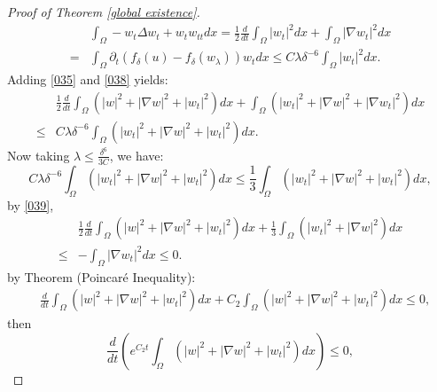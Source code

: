 \documentclass{article}
\numberwithin{equation}{section}
\begin{document}
\begin{proof}[Proof of Theorem \ref{global existence}]
\begin{equation}
\begin{aligned}
&\int_{\Omega}-w_{t}\Delta w_{t}+w_{t}w_{tt} d x
=\frac{1}{2}\frac{d}{d t} \int_{\Omega}|w_{t}|^{2} d x+\int_{\Omega}|\nabla w_{t}|^{2} d x \\=&  \int_{\Omega}\partial_{t}\left(f_{\delta}(u)-f_{\delta}\left(w_{\lambda} \right)\right) w_{t} d x  \le  C \lambda \delta^{-6} \int_{\Omega}\left|w_{t}\right|^{2} d x.
\end{aligned}\label{038}
\end{equation}
Adding \eqref{035} and \eqref{038} yields:
\begin{equation}
\begin{aligned}
&\frac{1}{2}\frac{d}{d t} \int_{\Omega}\left(\left|w\right|^{2}+|\nabla w|^{2}+| w_t|^{2}\right) d x+\int_{\Omega}\left(\left|w_{t}\right|^{2}+|\nabla w|^{2}+|\nabla w_t|^{2}\right) d x
\\ \le &C \lambda \delta^{-6} \int_{\Omega}\left(\left|w_{t}\right|^{2}+|\nabla w|^{2}+| w_t|^{2}\right) d x.
\end{aligned} \label{039}
\end{equation}
Now taking $\lambda \le \frac{\delta^{6}}{3 C}$, we have:
\begin{equation*}
C \lambda \delta^{-6} \int_{\Omega}\left(\left|w_{t}\right|^{2}+|\nabla w|^{2}+| w_t|^{2}\right) d x \le  \frac{1}{3}  \int_{\Omega}\left(\left|w_{t}\right|^{2}+|\nabla w|^{2}+| w_t|^{2}\right) d x,
\end{equation*}
by \eqref{039},
\begin{equation}
\begin{aligned}
&\frac{1}{2}\frac{d}{d t} \int_{\Omega}\left(\left|w\right|^{2}+|\nabla w|^{2}+| w_t|^{2}\right) d x+\frac{1}{3}\int_{\Omega}\left(\left|w_{t}\right|^{2}+|\nabla w|^{2}\right) d x
\\ \le &- \int_{\Omega}|\nabla w_{t}|^{2} d x \le 0.
\end{aligned} \label{040}
\end{equation}
by Theorem (Poincaré Inequality):
\begin{equation*}
\begin{aligned}
&\frac{d}{d t} \int_{\Omega}\left(\left|w\right|^{2}+|\nabla w|^{2}+| w_t|^{2}\right) d x+C_2\int_{\Omega}\left(\left|w\right|^{2}+|\nabla w|^{2}+| w_t|^{2}\right) d x \le 0,
\end{aligned}
\end{equation*}
then
\begin{equation*}
\frac{d}{d t}\left( e^{C_2t}\int_{\Omega}\left(\left|w\right|^{2}+|\nabla w|^{2}+| w_t|^{2}\right)  d x\right) \le 0,

\end{equation*}
\end{proof}
\end{document}
